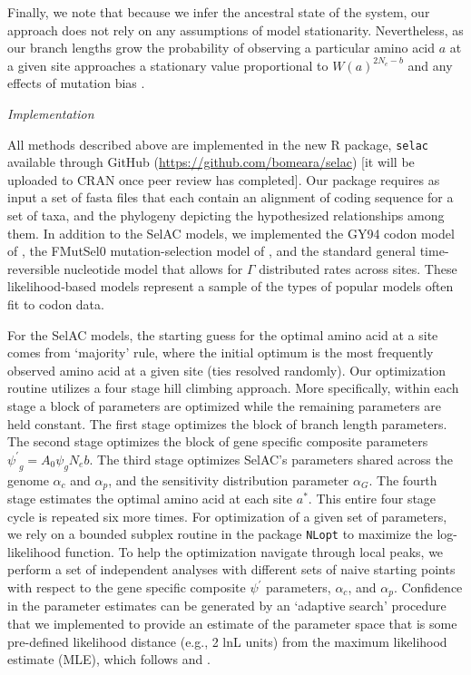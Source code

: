 \documentclass[12pt,letterpaper,fleqn]{article}
\renewcommand{\subsection}[1]{%
\bigskip
\begin{center}
\begin{large}
\normalfont\itshape #1
\end{large}
\end{center}}
\newcommand{\Ne}{\ensuremath{{N_e}}\xspace} %
\newcommand{\selac}{SelAC\xspace}
\newcommand{\alphac}{\ensuremath{\alpha_c}\xspace}
\newcommand{\alphag}{\ensuremath{\alpha_G}\xspace}
\newcommand{\alphap}{\ensuremath{\alpha_p}\xspace}
\newcommand{\aopt}{\ensuremath{a^*}\xspace}
\newcommand{\psiprime}{\ensuremath{\psi^\prime}\xspace}
\begin{document}
Finally, we note that because we infer the ancestral state of the system, our approach does not rely on any assumptions of model stationarity.
Nevertheless, as our branch lengths grow the probability of observing a particular amino acid $a$ at a given site approaches a stationary value proportional to $W(a)^{2 \Ne -b}$ and any effects of mutation bias \citep{SellaAndHirsh2005}.

\subsection{Implementation}\label{sec:implementation}
All methods described above are implemented in the new R package, \texttt{selac} available through GitHub (\url{https://github.com/bomeara/selac}) [it will be uploaded to CRAN once peer review has completed].
Our package requires as input a set of fasta files that each contain an alignment of coding sequence for a set of taxa, and the phylogeny depicting the hypothesized relationships among them.
In addition to the SelAC models, we implemented the GY94 codon model of \citet{GoldmanAndYang1994}, the FMutSel0 mutation-selection model of \citet{YangAndNielsen2008}, and the standard general time-reversible nucleotide model that allows for $\Gamma$ distributed rates across sites.
These likelihood-based models represent a sample of the types of popular models often fit to codon data.

For the \selac models, the starting guess for the optimal amino acid at a site comes from `majority' rule, where the initial optimum is the most frequently observed amino acid at a given site (ties resolved randomly).
Our optimization routine utilizes a four stage hill climbing approach.
More specifically, within each stage a block of parameters are optimized while the remaining parameters are held constant.
The first stage optimizes the block of branch length parameters.
The second stage optimizes the block of gene specific composite parameters $ \psiprime_g = A_0 \psi_g \Ne b$.
The third stage optimizes \selac's parameters shared across the genome $\alphac$ and $\alphap$, and the sensitivity distribution parameter $\alphag$.
The fourth stage estimates the optimal amino acid at each site \aopt.
This entire four stage cycle is repeated six more times.
For optimization of a given set of parameters, we rely on a bounded subplex routine \citep{Rowan1990} in the package \texttt{NLopt} \citep{Johnson2012} to maximize the log-likelihood function.
To help the optimization navigate through local peaks, we perform a set of independent analyses with different sets of naive starting points with respect to the gene specific composite $\psiprime$ parameters, $\alphac$, and $\alphap$.
Confidence in the parameter estimates can be generated by an `adaptive search' procedure that we implemented to provide an estimate of the parameter space that is some pre-defined likelihood distance (e.g., 2 lnL units) from the maximum likelihood estimate (MLE), which follows \citet{BeaulieuAndOMeara2016} and \citet{edwards1984likelihood}.
\end{document}
